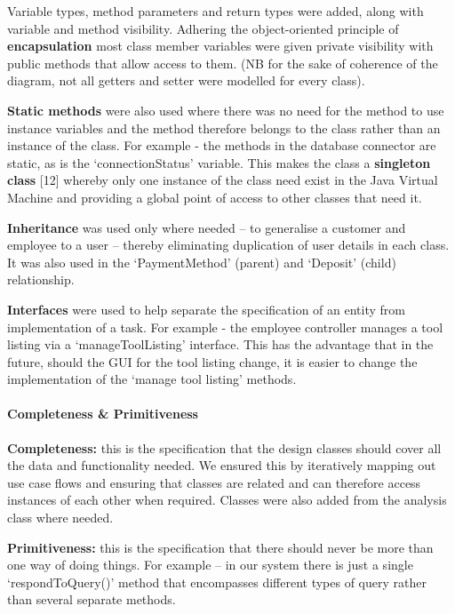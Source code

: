 Variable types, method parameters and return types were added, along
with variable and method visibility. Adhering the object-oriented
principle of \textbf{encapsulation} most class member variables were
given private visibility with public methods that allow access to them.
(NB for the sake of coherence of the diagram, not all getters and setter
were modelled for every class).

\textbf{Static methods} were also used where there was no need for the
method to use instance variables and the method therefore belongs to the
class rather than an instance of the class. For example - the methods in
the database connector are static, as is the `connectionStatus'
variable. This makes the class a \textbf{singleton class} {[}12{]}
whereby only one instance of the class need exist in the Java Virtual
Machine and providing a global point of access to other classes that
need it.

\textbf{Inheritance} was used only where needed -- to generalise a
customer and employee to a user -- thereby eliminating duplication of
user details in each class. It was also used in the `PaymentMethod'
(parent) and `Deposit' (child) relationship.

\textbf{Interfaces} were used to help separate the specification of an
entity from implementation of a task. For example - the employee
controller manages a tool listing via a `manageToolListing' interface.
This has the advantage that in the future, should the GUI for the tool
listing change, it is easier to change the implementation of the `manage
tool listing' methods.

\hypertarget{completeness-primitiveness}{%
\paragraph{Completeness \&
Primitiveness}\label{completeness-primitiveness}}

\textbf{Completeness: } this is the specification that the design
classes should cover all the data and functionality needed. We ensured
this by iteratively mapping out use case flows and ensuring that classes
are related and can therefore access instances of each other when
required. Classes were also added from the analysis class where needed.

\textbf{Primitiveness:} this is the specification that there should
never be more than one way of doing things. For example -- in our system
there is just a single `respondToQuery()' method that encompasses
different types of query rather than several separate methods.

